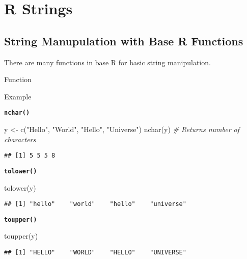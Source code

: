 \documentclass[
]{book}
\newenvironment{Shaded}{\begin{snugshade}}{\end{snugshade}}
\newcommand{\CommentTok}[1]{\textcolor[rgb]{0.56,0.35,0.01}{\textit{#1}}}
\newcommand{\FunctionTok}[1]{\textcolor[rgb]{0.00,0.00,0.00}{#1}}
\newcommand{\NormalTok}[1]{#1}
\newcommand{\OtherTok}[1]{\textcolor[rgb]{0.56,0.35,0.01}{#1}}
\newcommand{\StringTok}[1]{\textcolor[rgb]{0.31,0.60,0.02}{#1}}
\begin{document}
\hypertarget{r-strings}{%
\chapter{R Strings}\label{r-strings}}

\hypertarget{string-manupulation-with-base-r-functions}{%
\section{String Manupulation with Base R Functions}\label{string-manupulation-with-base-r-functions}}

There are many functions in base R for basic string manipulation.

Function

Example

{\textbf{\texttt{nchar()}
}}

\begin{Shaded}
\begin{Highlighting}[]
\NormalTok{y }\OtherTok{\textless{}{-}} \FunctionTok{c}\NormalTok{(}\StringTok{"Hello"}\NormalTok{, }\StringTok{"World"}\NormalTok{, }\StringTok{"Hello"}\NormalTok{, }\StringTok{"Universe"}\NormalTok{)}
\FunctionTok{nchar}\NormalTok{(y) }\CommentTok{\# Returns number of characters}
\end{Highlighting}
\end{Shaded}

\begin{verbatim}
## [1] 5 5 5 8
\end{verbatim}

{\textbf{\texttt{tolower()}
}}

\begin{Shaded}
\begin{Highlighting}[]
\FunctionTok{tolower}\NormalTok{(y)}
\end{Highlighting}
\end{Shaded}

\begin{verbatim}
## [1] "hello"    "world"    "hello"    "universe"
\end{verbatim}

{\textbf{\texttt{toupper()}
}}

\begin{Shaded}
\begin{Highlighting}[]
\FunctionTok{toupper}\NormalTok{(y)}
\end{Highlighting}
\end{Shaded}

\begin{verbatim}
## [1] "HELLO"    "WORLD"    "HELLO"    "UNIVERSE"
\end{verbatim}
\end{document}
